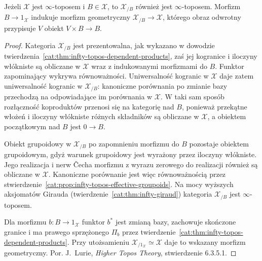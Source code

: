 \begin{stwierdzenie}\label{cat:prop:infty-topos-slice}
Jeżeli $\mathcal X$ jest $\infty$-toposem i $B\in\mathcal X$, to $\mathcal X_{/B}$ również jest $\infty$-toposem. Morfizm $B\to1_{\mathcal X}$ indukuje morfizm geometryczny $\mathcal X_{/B}\to\mathcal X$, którego obraz odwrotny przypisuje $V$ obiekt $V\times B\to B$.
\end{stwierdzenie}
\begin{proof}
Kategoria $\mathcal X_{/B}$ jest prezentowalna, jak wykazano w dowodzie twierdzenia~\ref{cat:thm:infty-topos-dependent-products}, zaś jej kogranice i iloczyny włókniste są obliczane w $\mathcal X$ wraz z indukowanymi morfizmami do $B$. Funktor zapominający wykrywa równoważności. Uniwersalność kogranic w $\mathcal X$ daje zatem uniwersalność kogranic w $\mathcal X_{/B}$: kanoniczne porównania po zmianie bazy przechodzą na odpowiadające im porównania w $\mathcal X$. W taki sam sposób rozłączność koproduktów przenosi się na kategorię nad $B$, ponieważ przekątne włożeń i iloczyny włókniste różnych składników są obliczane w $\mathcal X$, a obiektem początkowym nad $B$ jest $0\to B$.

Obiekt grupoidowy w $\mathcal X_{/B}$ po zapomnieniu morfizmu do $B$ pozostaje obiektem grupoidowym, gdyż warunek grupoidowy jest wyrażony przez iloczyny włókniste. Jego realizacja i nerw Čecha morfizmu z wyrazu zerowego do realizacji również są obliczane w $\mathcal X$. Kanoniczne porównanie jest więc równoważnością przez stwierdzenie~\ref{cat:prop:infty-topos-effective-groupoids}. Na mocy wyższych aksjomatów Girauda (twierdzenie~\ref{cat:thm:infty-giraud}) kategoria $\mathcal X_{/B}$ jest $\infty$-toposem.

Dla morfizmu $b:B\to1_{\mathcal X}$ funktor $b^*$ jest zmianą bazy, zachowuje skończone granice i ma prawego sprzężonego $\Pi_b$ przez twierdzenie~\ref{cat:thm:infty-topos-dependent-products}. Przy utożsamieniu $\mathcal X_{/1_{\mathcal X}}\simeq\mathcal X$ daje to wskazany morfizm geometryczny. Por. J.~Lurie, \emph{Higher Topos Theory}, stwierdzenie 6.3.5.1.
\end{proof}

